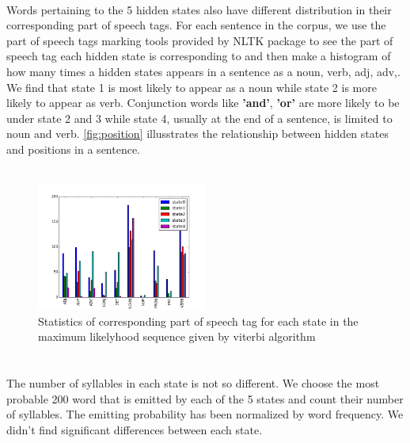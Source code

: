 \paragraph{}
Words pertaining to the 5 hidden states also have different distribution in their corresponding part of speech tags.  For each sentence in the corpus, we use the part of speech tags marking tools provided by NLTK package to see the part of speech tag each hidden state is corresponding to and then make a histogram of how many times a hidden states appears in a sentence as a noun, verb, adj, adv,. We find that state 1 is most likely to appear as a noun while state 2 is more likely to appear as verb. Conjunction words like \textbf{'and'}, \textbf{'or'} are more likely to be under state 2 and 3 while state 4, usually at the end of a sentence, is limited to noun and verb. \ref{fig:position} illusstrates the relationship between hidden states and positions in a sentence.
\\
\\
 \begin{figure}[h]
 \centering
 \includegraphics[width=0.5\textwidth]{./figure/hiddenstate_partofspeechtag.png}
 \caption{Statistics of corresponding part of speech tag for each state in the maximum likelyhood sequence given by viterbi algorithm}
 \end{figure}
\paragraph{}
\section*{}
The number of syllables in each state is not so different. We choose the most probable 200 word that is emitted by each of the 5 states and count their number of syllables. The emitting probability has been normalized by word frequency. We didn’t find significant differences between each state. 


